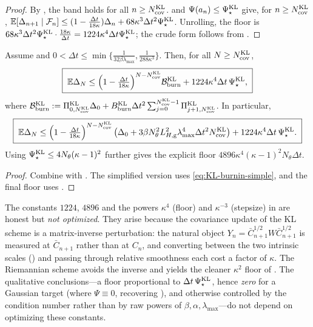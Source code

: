 \begin{proof}
By , the band holds for all $n\geq N_{\mathrm{cov}}^{\mathrm{KL}}$.
 and $\Psi(a_n)\leq\Psi_\star^{\mathrm{KL}}$ give, for $n\geq N_{\mathrm{cov}}^{\mathrm{KL}}$,
$\mathbb{E}[\Delta_{n+1}\mid\mathcal{F}_n]\leq(1-\tfrac{\Delta t}{18\kappa})\Delta_n+68\kappa^3\Delta t^2\Psi_\star^{\mathrm{KL}}$.
Unrolling, the floor is $68\kappa^3\Delta t^2\Psi_\star^{\mathrm{KL}}\cdot\tfrac{18\kappa}{\Delta t}=1224\kappa^4\Delta t\Psi_\star^{\mathrm{KL}}$;
the crude form follows from .
\end{proof}

\begin{corollary}
\label{cor:KL-STL-closed-global}
Assume  and
$0<\Delta t\leq\min\{\frac1{32\beta\lambda_{\max}},\frac1{288\kappa^3}\}$.
Then, for all $N\geq N_{\mathrm{cov}}^{\mathrm{KL}}$,
\[
    \boxed{\;
    \mathbb{E}\Delta_N
    \leq
    \Bigl(1-\tfrac{\Delta t}{18\kappa}\Bigr)^{N-N_{\mathrm{cov}}^{\mathrm{KL}}}
    \mathcal B_{\mathrm{burn}}^{\mathrm{KL}}
    +
    1224\kappa^4\Delta t\,\Psi_\star^{\mathrm{KL}},
    \;}
\]
where
$\mathcal B_{\mathrm{burn}}^{\mathrm{KL}}:=\Pi_{0,N_{\mathrm{cov}}^{\mathrm{KL}}}^{\mathrm{KL}}\Delta_0+B_{\mathrm{burn}}^{\mathrm{KL}}\Delta t^2\sum_{j=0}^{N_{\mathrm{cov}}^{\mathrm{KL}}-1}\Pi_{j+1,N_{\mathrm{cov}}^{\mathrm{KL}}}^{\mathrm{KL}}$.
In particular,
\[
    \boxed{\;
    \mathbb{E}\Delta_N
    \leq
    \Bigl(1-\tfrac{\Delta t}{18\kappa}\Bigr)^{N-N_{\mathrm{cov}}^{\mathrm{KL}}}
    \left(
        \Delta_0+
        3\beta N_\theta^2L_{H,\mathrm g}^2\lambda_{\max}^4\Delta t^2N_{\mathrm{cov}}^{\mathrm{KL}}
    \right)
    +
    1224\kappa^4\Delta t\,\Psi_\star^{\mathrm{KL}}.
    \;}
\]
Using $\Psi_\star^{\mathrm{KL}}\leq4N_\theta(\kappa-1)^2$ further gives the explicit floor
$4896\kappa^4(\kappa-1)^2N_\theta\Delta t$.
\end{corollary}

\begin{proof}
Combine  with . The simplified
version uses \eqref{eq:KL-burnin-simple}, and the final floor uses .
\end{proof}

\begin{remark}
\label{rem:KL-constants}
The constants $1224$, $4896$ and the powers $\kappa^4$ (floor) and $\kappa^{-3}$ (stepsize)
in  are honest but \emph{not optimized}. They arise because the
covariance update of the KL scheme is a matrix-inverse perturbation: the natural object
$Y_n=\bar C_{n+1}^{1/2}W\bar C_{n+1}^{1/2}$ is measured at $\bar C_{n+1}$ rather than at
$C_n$, and converting between the two intrinsic scales () and passing
through relative smoothness each cost a factor of $\kappa$. The Riemannian scheme avoids
the inverse and yields the cleaner $\kappa^2$ floor of . The
qualitative conclusions---a floor proportional to $\Delta t\,\Psi_\star^{\mathrm{KL}}$, hence
\emph{zero} for a Gaussian target (where $\Psi\equiv0$, recovering ),
and otherwise controlled by the condition number rather than by raw powers of
$\beta,\alpha,\lambda_{\max}$---do not depend on optimizing these constants.
\end{remark}

